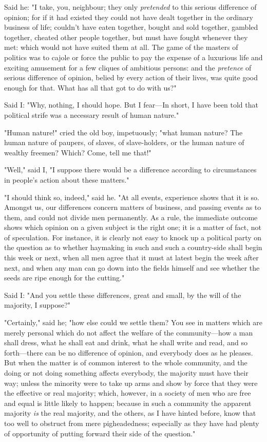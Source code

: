 Said he: "I take, you, neighbour; they only \emph{pretended} to this
serious difference of opinion; for if it had existed they could not have
dealt together in the ordinary business of life; couldn't have eaten
together, bought and sold together, gambled together, cheated other
people together, but must have fought whenever they met: which would not
have suited them at all. The game of the masters of politics was to
cajole or force the public to pay the expense of a luxurious life and
exciting amusement for a few cliques of ambitious persons: and the
\emph{pretence} of serious difference of opinion, belied by every action
of their lives, was quite good enough for that. What has all that got to
do with us?"

Said I: "Why, nothing, I should hope. But I fear---In short, I have been
told that political strife was a necessary result of human nature."

"Human nature!" cried the old boy, impetuously; "what human nature? The
human nature of paupers, of slaves, of slave-holders, or the human
nature of wealthy freemen? Which? Come, tell me that!"

"Well," said I, "I suppose there would be a difference according to
circumstances in people's action about these matters."

"I should think so, indeed," said he. "At all events, experience shows
that it is so. Amongst us, our differences concern matters of business,
and passing events as to them, and could not divide men permanently. As
a rule, the immediate outcome shows which opinion on a given subject is
the right one; it is a matter of fact, not of speculation. For instance,
it is clearly not easy to knock up a political party on the question as
to whether haymaking in such and such a country-side shall begin this
week or next, when all men agree that it must at latest begin the week
after next, and when any man can go down into the fields himself and see
whether the seeds are ripe enough for the cutting."

Said I: "And you settle these differences, great and small, by the will
of the majority, I suppose?"

"Certainly," said he; "how else could we settle them? You see in matters
which are merely personal which do not affect the welfare of the
community---how a man shall dress, what he shall eat and drink, what he
shall write and read, and so forth---there can be no difference of
opinion, and everybody does as he pleases. But when the matter is of
common interest to the whole community, and the doing or not doing
something affects everybody, the majority must have their way; unless
the minority were to take up arms and show by force that they were the
effective or real majority; which, however, in a society of men who are
free and equal is little likely to happen; because in such a community
the apparent majority \emph{is} the real majority, and the others, as I
have hinted before, know that too well to obstruct from mere
pigheadedness; especially as they have had plenty of opportunity of
putting forward their side of the question."

